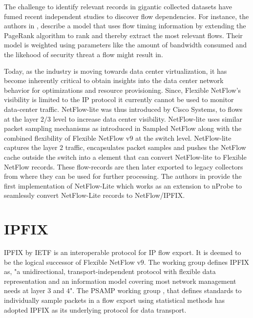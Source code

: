 The challenge to identify relevant records in gigantic collected datasets have fumed recent independent studies to discover flow dependencies. For instance, the authors in \cite{swang:2010}, describe a model that uses flow timing information by extending  the PageRank \cite{lpage:1999} algorithm to rank and thereby extract the most relevant flows. Their model is weighted using parameters like the amount of bandwidth consumed and the likehood of security threat a flow might result in.

Today, as the industry is moving towards data center virtualization, it has become inherently critical to obtain insights into the data center network behavior for optimizations and resource provisioning. Since, Flexible NetFlow's visibility is limited to the \ac{IP} protocol it currently cannot be used to monitor data-center traffic. NetFlow-lite was thus introduced by Cisco Systems, to flows at the layer $2/3$ level to increase data center visibility. NetFlow-lite uses similar packet sampling mechanisms as introduced in Sampled NetFlow along with the combined flexibility of Flexible NetFlow v$9$ at the switch level. NetFlow-lite captures the  layer $2$ traffic, encapsulates packet samples and pushes the NetFlow cache outside the switch into a element that can convert NetFlow-lite to Flexible NetFlow records. These flow-records are then later exported to legacy collectors from where they can be used for further processing. The authors in \cite{lderi:2011} provide the first implementation of NetFlow-Lite which works as an extension to nProbe \cite{lderi:2003} to seamlessly convert NetFlow-Lite records to NetFlow/\ac{IPFIX}.

\section{IPFIX}\label{sec:ipfix}
\ac{IPFIX} \cite{rfc5101} by \ac{IETF} is an interoperable protocol for \ac{IP} flow export. It is deemed to be the logical successor of Flexible NetFlow v$9$. The working group defines \ac{IPFIX} as, "a unidirectional, transport-independent protocol with flexible data representation and an information model covering most network management needs at layer $3$ and $4$". The \ac{PSAMP} working group \cite{rfc5476}, that defines standards to individually sample packets in a flow export using statistical methods has adopted \ac{IPFIX} as its underlying protocol for data transport.

